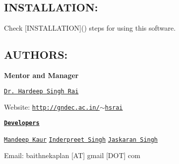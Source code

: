 \subsection*{I\-N\-S\-T\-A\-L\-L\-A\-T\-I\-O\-N\-: }

Check \mbox{[}I\-N\-S\-T\-A\-L\-L\-A\-T\-I\-O\-N\mbox{]}() steps for using this software.

\subsection*{A\-U\-T\-H\-O\-R\-S\-: }

{\bfseries Mentor and Manager}

\href{https://github.com/hsrai}{\tt Dr. Hardeep Singh Rai}

Website\-: \href{http://gndec.ac.in/~hsrai}{\tt http\-://gndec.\-ac.\-in/$\sim$hsrai}

{\bfseries \href{https://github.com/GreatDevelopers/bakaplan/wiki/Contributors}{\tt Developers}}

\href{https://github.com/megha55}{\tt Mandeep Kaur} \href{https://github.com/inderpreetsingh}{\tt Inderpreet Singh} \href{https://github.com/Jaskaran28193}{\tt Jaskaran Singh}

Email\-: baithnekaplan \mbox{[}A\-T\mbox{]} gmail \mbox{[}D\-O\-T\mbox{]} com 